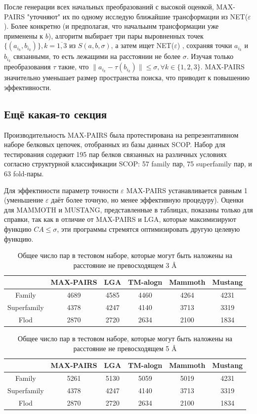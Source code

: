 \documentclass[a4papper]{article}
\newcommand{\angstrom}{\text\normalfont\AA}
\newcommand{\eps}{\varepsilon}
\begin{document}
После генерации всех начальных преобразований с высокой оценкой, MAX-PAIRS "уточняют" их по одному исследую ближайшие трансформации из NET($\eps$). Более конкретно (и предполагая, что начальынм трансформации уже применены к $b$), алгоритм выбирает три пары выровненных точек $\{(a_{i_k}, b_{i_k})\}, k = \overline{1, 3}$ из $S(a, b, \sigma)$, а затем ищет NET($\eps$)
, сохраняя точки $a_{i_k}$ и $b_{i_k}$ связанными, то есть лежащими на расстоянии не более $\sigma$. Изучая только преобразования $\tau$ такие, что $\| a_{i_k} - \tau(b_{i_k})\| \leq \sigma, \forall k \in \{1, 2, 3 \}$. MAX-PAIRS значительно уменьшает размер пространства поиска, что приводит к повышению эффективности.

\subsection{Ещё какая-то секция}

Производительность MAX-PAIRS была протестирована на репрезентативном наборе белковых цепочек, отобранных из базы данных SCOP. Набор для тестирования содержит 195 пар белков связанных на различных условиях согласно структурной классификации SCOP: 57 family пар, 75 superfamily пар, и 63 fold-пары.

Для эффектиности параметр точности $\eps$ MAX-PAIRS устанавливается равным 1 (уменьшение $\eps$ даёт более точную, но менее эффективную процедуру). Оценки для MAMMOTH и MUSTANG, представленные в таблицах, показаны только для справки, так как в отличие от MAX-PAIRS и LGA, которые максимизируют функцию $CA \leq \sigma$, эти программы стремятся оптимизировать другую целевую функцию.
\begin{center}
\begin{table}
\caption{ Общее число пар в тестовом наборе, которые могут быть наложены на расстояние не превосходящем 3 \angstrom}
\begin{tabular}{|c|ccccc|}
\hline
& MAX-PAIRS & LGA & TM-alogn & Mammoth & Mustang\\
\hline
Family & 4689 & 4585 & 4460 & 4264 & 4231\\
Superfamily & 4378 & 4247 & 4140 & 3713 & 3319\\
Flod & 2870 & 2720 & 2634 & 2100 & 1834\\
\hline
\end{tabular}
\end{table}
\begin{table}
\caption{ Общее число пар в тестовом наборе, которые могут быть наложены на расстояние не превосходящем 5 \angstrom}
\begin{tabular}{|c|ccccc|}
\hline
& MAX-PAIRS & LGA & TM-alogn & Mammoth & Mustang\\
\hline
Family & 5261 & 5130 & 5059 & 5019 & 4231\\
Superfamily & 4378 & 4247 & 4140 & 3713 & 3319\\
Flod & 2870 & 2720 & 2634 & 2100 & 1834\\
\hline
\end{tabular}
\end{table}
\end{center}
\end{document}
